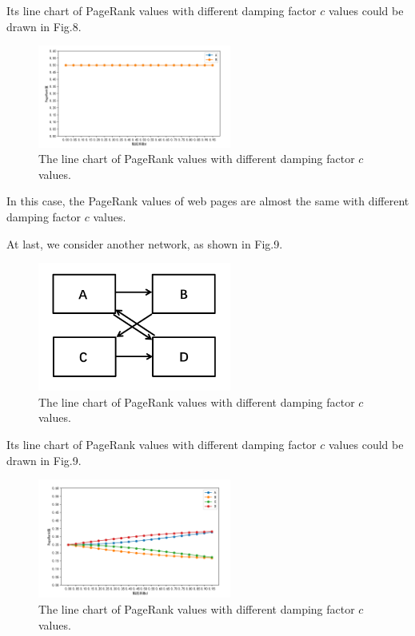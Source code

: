 \documentclass[lettersize,journal,12pt,conference]{IEEEtran}
\begin{document}
Its line chart of PageRank values with different damping factor $c$ values could be drawn in Fig.8.

\begin{figure}[h]
	\centering
	\includegraphics[width=2.5in]{images/fig10.png}
	\caption{The line chart of PageRank values with different damping factor $c$ values.}
	\label{fig10}
\end{figure}

In this case, the PageRank values of web pages are almost the same with different damping factor $c$ values.

At last, we consider another network, as shown in Fig.9.

\begin{figure}[h]
	\centering
	\includegraphics[width=2.5in]{images/fig11.png}
	\caption{The line chart of PageRank values with different damping factor $c$ values.}
	\label{fig11}
\end{figure}

Its line chart of PageRank values with different damping factor $c$ values could be drawn in Fig.9.

\begin{figure}[h]
	\centering
	\includegraphics[width=2.5in]{images/fig12.png}
	\caption{The line chart of PageRank values with different damping factor $c$ values.}
	\label{fig12}
\end{figure}
\end{document}
